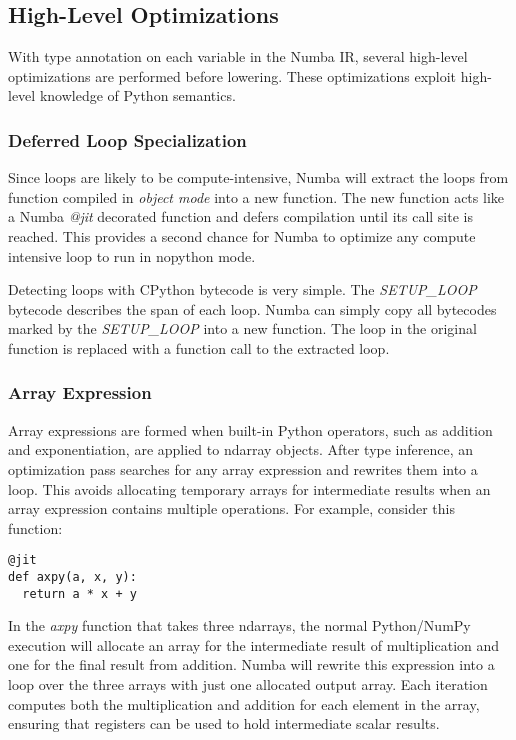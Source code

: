 \documentclass{acm_proc_article-sp}
\begin{document}
\subsection{High-Level Optimizations}

With type annotation on each variable in the Numba IR, several high-level
optimizations are performed before lowering. These optimizations exploit
high-level knowledge of Python semantics.

\subsubsection{Deferred Loop Specialization}

Since loops are likely to be compute-intensive, Numba will extract the
loops from function compiled in \textit{object mode} into a new
function.  The new function acts like a Numba \textit{@jit} decorated
function and defers compilation until its call site is reached. This
provides a second chance for Numba to optimize any compute intensive
loop to run in nopython mode.

Detecting loops with CPython bytecode is very simple. The
\textit{SETUP\_LOOP} bytecode describes the span of each loop. Numba
can simply copy all bytecodes marked by the \textit{SETUP\-\_LOOP} into
a new function. The loop in the original function is replaced with a
function call to the extracted loop.

\subsubsection{Array Expression}

Array expressions are formed when built-in Python operators, such as
addition and exponentiation, are applied to ndarray objects. After
type inference, an optimization pass searches for any array expression
and rewrites them into a loop. This avoids allocating temporary arrays
for intermediate results when an array expression contains multiple
operations.  For example, consider this function:

\begin{lstlisting}
@jit
def axpy(a, x, y):
  return a * x + y
\end{lstlisting}

In the \textit{axpy} function that takes three ndarrays, the normal
Python/NumPy execution will allocate an array for the intermediate
result of multiplication and one for the final result from
addition. Numba will rewrite this expression into a loop over the
three arrays with just one allocated output array.  Each iteration
computes both the multiplication and addition for each element in the
array, ensuring that registers can be used to hold intermediate scalar
results.
\end{document}
